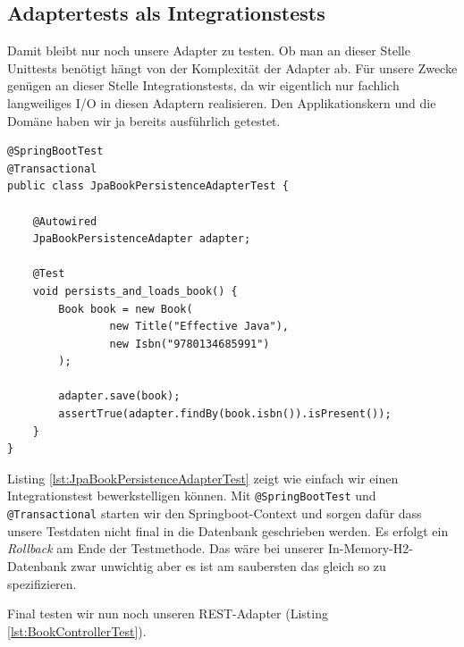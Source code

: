 \subsection{Adaptertests als Integrationstests}
Damit bleibt nur noch unsere Adapter zu testen. Ob man an dieser Stelle
Unittests benötigt hängt von der Komplexität der Adapter ab. Für unsere
Zwecke genügen an dieser Stelle Integrationstests, da wir eigentlich nur
fachlich langweiliges I/O in diesen Adaptern realisieren. Den Applikationskern
und die Domäne haben wir ja bereits ausführlich getestet.

\begin{listing}[H]
\begin{verbatim}
@SpringBootTest
@Transactional
public class JpaBookPersistenceAdapterTest {
    
    @Autowired
    JpaBookPersistenceAdapter adapter;

    @Test
    void persists_and_loads_book() {
        Book book = new Book(
                new Title("Effective Java"),
                new Isbn("9780134685991")
        );

        adapter.save(book);
        assertTrue(adapter.findBy(book.isbn()).isPresent());
    }
}
\end{verbatim}
\caption{Integrationtest des JpaBookPersistenceAdapter}
\label{lst:JpaBookPersistenceAdapterTest}
\end{listing}

Listing \ref{lst:JpaBookPersistenceAdapterTest} zeigt wie einfach wir einen
Integrationstest bewerkstelligen können. Mit \texttt{@SpringBootTest} und
\texttt{@Transactional} starten wir den Springboot-Context und sorgen
dafür dass unsere Testdaten nicht final in die Datenbank geschrieben werden.
Es erfolgt ein \textit{Rollback} am Ende der Testmethode.
Das wäre bei unserer In-Memory-H2-Datenbank zwar unwichtig aber es ist am 
saubersten das gleich so zu spezifizieren.

Final testen wir nun noch unseren REST-Adapter (Listing \ref{lst:BookControllerTest}).

